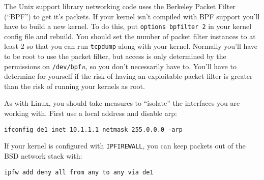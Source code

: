 \subsubsection{\freebsd{}}

The Unix support library networking code uses the Berkeley Packet Filter
(``BPF'') to get it's packets.  If your kernel isn't compiled with BPF support
you'll have to build a new kernel.  To do this, put {\tt options
bpfilter 2} in your kernel config file and rebuild.  You should set
the number of packet filter instances to at least 2 so that you can
run {\tt tcpdump} along with your \oskit{} kernel.  Normally you'll have to be
root to use the packet filter, but access is only determined by the
permissions on {\tt /dev/bpf}\emph{n}, so you don't necessarily have to.  You'll
have to determine for yourself if the risk of having an exploitable
packet filter is greater than the risk of running your \oskit{} kernels
as root.

As with Linux, you should take measures to ``isolate'' the interfaces you
are working with.  First use a local address and disable arp:

\begin{verbatim}
ifconfig de1 inet 10.1.1.1 netmask 255.0.0.0 -arp
\end{verbatim}

If your kernel is configured with {\tt IPFIREWALL}, you can keep packets
out of the BSD network stack with:

\begin{verbatim}
ipfw add deny all from any to any via de1
\end{verbatim}
